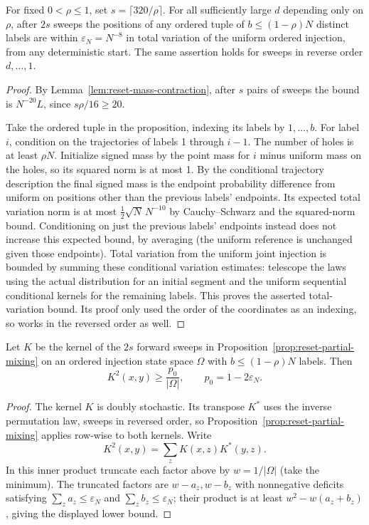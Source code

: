 \begin{proposition}\label{prop:reset-partial-mixing}
For fixed $0<\rho\le1$, set $s=\lceil320/\rho\rceil$. For all sufficiently large $d$ depending only on $\rho$, after $2s$ sweeps the positions of any ordered tuple of $b\le(1-\rho)N$ distinct labels are within $\varepsilon_N=N^{-8}$ in total variation of the uniform ordered injection, from any deterministic start. The same assertion holds for sweeps in reverse order $d,\ldots,1$.
\end{proposition}
\begin{proof}
By Lemma~\ref{lem:reset-mass-contraction}, after $s$ pairs of sweeps the bound is $N^{-20}L$, since $s\rho/16\ge20$.

Take the ordered tuple in the proposition, indexing its labels by \(1,\ldots,b\). For label \(i\), condition on the trajectories of labels 1 through \(i-1\). The number of holes is at least \(\rho N\). Initialize signed mass by the point mass for \(i\) minus uniform mass on the holes, so its squared norm is at most 1. By the conditional trajectory description the final signed mass is the endpoint probability difference from uniform on positions other than the previous labels' endpoints. Its expected total variation norm is at most \(\frac12\sqrt{N}\, N^{-10}\) by Cauchy--Schwarz and the squared-norm bound. Conditioning on just the previous labels' endpoints instead does not increase this expected bound, by averaging (the uniform reference is unchanged given those endpoints). Total variation from the uniform joint injection is bounded by summing these conditional variation estimates: telescope the laws using the actual distribution for an initial segment and the uniform sequential conditional kernels for the remaining labels. This proves the asserted total-variation bound. Its proof only used the order of the coordinates as an indexing, so works in the reversed order as well.

\end{proof}

\begin{corollary}\label{prop:reset-minorization}
Let \(K\) be the kernel of the \(2s\) forward sweeps in Proposition~\ref{prop:reset-partial-mixing} on an ordered injection state space \(\Omega\) with \(b\le (1-\rho)N\) labels. Then
\[
K^2(x,y)\ge \frac{p_0}{|\Omega|},\qquad p_0=1-2\varepsilon_N.
\]
\end{corollary}
\begin{proof}
The kernel $K$ is doubly stochastic. Its transpose $K^*$ uses the inverse permutation law, sweeps in reversed order, so Proposition~\ref{prop:reset-partial-mixing} applies row-wise to both kernels. Write
\[
K^2(x,y)=\sum_z K(x,z)K^*(y,z).
\]
In this inner product truncate each factor above by \(w=1/|\Omega|\) (take the minimum). The truncated factors are \(w-a_z,w-b_z\) with nonnegative deficits satisfying \(\sum_z a_z\le\varepsilon_N\) and \(\sum_z b_z\le\varepsilon_N\); their product is at least \(w^2-w(a_z+b_z)\), giving the displayed lower bound.

\end{proof}

